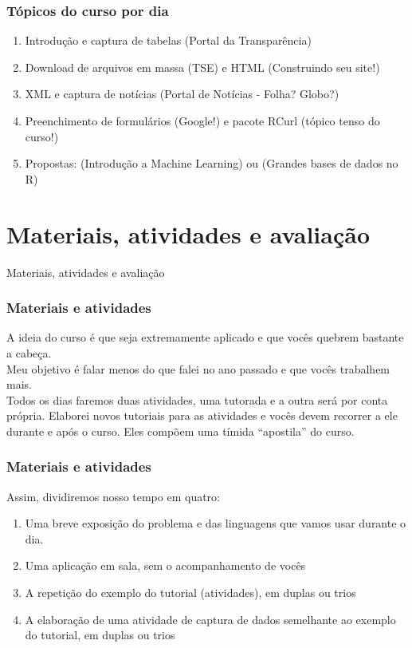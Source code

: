 \documentclass[11pt]{beamer}
\begin{document}
\begin{frame}
	\frametitle{Tópicos do curso por dia}
	\begin{enumerate}
		\item Introdução e captura de tabelas (Portal da Transparência)
		\item Download de arquivos em massa (TSE) e HTML (Construindo seu site!)
		\item XML e captura de notícias (Portal de Notícias - Folha? Globo?)
		\item Preenchimento de formulários (Google!) e pacote RCurl (tópico tenso do curso!)
		\item Propostas: (Introdução a Machine Learning) ou (Grandes bases de dados no R)
	\end{enumerate}
\end{frame}

\section{Materiais, atividades e avaliação}
\begin{frame}
	\LARGE{Materiais, atividades e avaliação}
\end{frame}

\begin{frame}
	\frametitle{Materiais e atividades}
	A ideia do curso é que seja extremamente aplicado e que vocês quebrem bastante a cabeça.
	\newline\\
	Meu objetivo é falar menos do que falei no ano passado e que vocês trabalhem mais.
	\newline\\
	Todos os dias faremos duas atividades, uma tutorada e a outra será por conta própria. Elaborei novos tutoriais para as atividades e vocês devem recorrer a ele durante e após o curso. Eles compõem uma tímida ``apostila'' do curso.
\end{frame}

\begin{frame}
	\frametitle{Materiais e atividades}
	 Assim, dividiremos nosso tempo em quatro:
	\begin{enumerate} 
		\item Uma breve exposição do problema e das linguagens que vamos usar durante o dia.
		\item Uma aplicação em sala, sem o acompanhamento de vocês
		\item A repetição do exemplo do tutorial (atividades), em duplas ou trios 
		\item A elaboração de uma atividade de captura de dados semelhante ao exemplo do tutorial, em duplas ou trios 
	\end{enumerate}
\end{frame}
\end{document}
